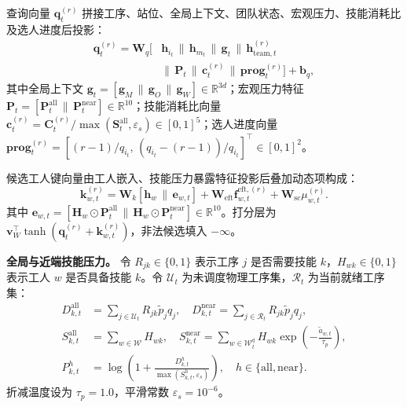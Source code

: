 \documentclass[journal,10pt]{IEEEtran}
\begin{document}
查询向量 $\mathbf q_t^{(r)}$ 拼接工序、站位、全局上下文、团队状态、宏观压力、技能消耗比及选人进度后投影：
\begin{equation}
\begin{aligned}
\mathbf q_t^{(r)} = \mathbf W_q\Big[ &\mathbf h_{i_t}\,\|\,\mathbf h_{m_t}\,\|\,\mathbf g_t\,\|\,\mathbf h_{\mathrm{team},t}^{(r)} \\
&\|\,\mathbf P_t\,\|\,\mathbf c_t^{(r)}\,\|\,\mathbf{prog}_t^{(r)}\Big]+\mathbf b_q,
\end{aligned}
\end{equation}
其中全局上下文 $\mathbf g_t = [\mathbf g_M \,\|\, \mathbf g_O \,\|\, \mathbf g_W] \in \mathbb R^{3d}$；宏观压力特征 $\mathbf P_t = [\mathbf P_t^{\mathrm{all}} \,\|\, \mathbf P_t^{\mathrm{near}}] \in \mathbb R^{10}$；技能消耗比向量 $\mathbf c_t^{(r)} = \mathbf C_t^{(r)} / \max(\mathbf S_t^{\mathrm{all}}, \varepsilon_s) \in [0,1]^5$；选人进度向量 $\mathbf{prog}_t^{(r)} = [(r-1)/q_{i_t},\, (q_{i_t}-(r-1))/q_{i_t}]^\top \in [0,1]^2$。

候选工人键向量由工人嵌入、技能压力暴露特征投影后叠加动态项构成：
\begin{equation}
\mathbf k_{w,t}^{(r)} = \mathbf W_k [\mathbf h_w \,\|\, \mathbf e_{w,t}] + \mathbf W_{\mathrm{eft}}\mathbf f_{w,t}^{\mathrm{eft},(r)} + \mathbf W_{\mathrm{sc}}\mu_{w,t}^{(r)}.
\end{equation}
其中 $\mathbf e_{w,t} = [\mathbf H_w \odot \mathbf P_t^{\mathrm{all}} \,\|\, \mathbf H_w \odot \mathbf P_t^{\mathrm{near}}] \in \mathbb R^{10}$。打分层为 $\mathbf v_W^{\top}\tanh(\mathbf q_t^{(r)} + \mathbf k_{w,t}^{(r)})$，非法候选填入 $-\infty$。

\textbf{全局与近端技能压力。} 令 $R_{jk}\in\{0,1\}$ 表示工序 $j$ 是否需要技能 $k$，$H_{wk}\in\{0,1\}$ 表示工人 $w$ 是否具备技能 $k$。令 $\mathcal U_t$ 为未调度物理工序集，$\mathcal R_t$ 为当前就绪工序集：
\begin{align}
D_{k,t}^{\mathrm{all}} &= \sum_{j\in\mathcal U_t}R_{jk}\widetilde p_jq_j, \quad D_{k,t}^{\mathrm{near}} = \sum_{j\in\mathcal R_t}R_{jk}\widetilde p_jq_j, \\
S_{k,t}^{\mathrm{all}} &= \sum_{w\in\mathcal W}H_{wk}, \quad S_{k,t}^{\mathrm{near}} = \sum_{w\in\mathcal W_t^q} H_{wk}\exp\!\left(-\frac{\widetilde a_{w,t}}{\tau_p}\right), \\
P_{k,t}^{h} &= \log\!\left( 1+\frac{D_{k,t}^{h}}{\max(S_{k,t}^{h},\varepsilon_s)} \right), \quad h\in\{\mathrm{all},\mathrm{near}\}.
\end{align}
折减温度设为 $\tau_p=1.0$，平滑常数 $\varepsilon_s=10^{-6}$。
\end{document}
